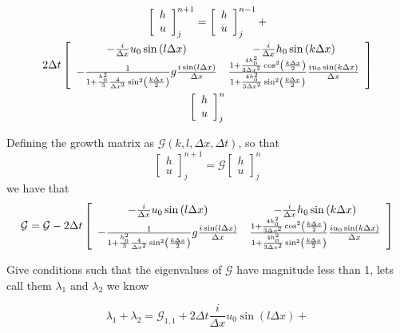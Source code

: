 \documentclass[12pt]{article}
\begin{document}
\begin{multline}
\left[\begin{array}{c}
h \\
u
\end{array} \right]^{n+1}_j = \left[\begin{array}{c}
h \\
u
\end{array} \right]^{n-1}_j  + \\2 \Delta t\left[\begin{array}{c c}
-\frac{i}{\Delta x}u_0 \sin\left(l \Delta x\right) & -\frac{i}{\Delta x}h_0\sin\left(k \Delta x\right) \\
-\frac{1}{1 +\frac{h_0^2}{3}\frac{4}{\Delta x^2}\sin^2\left(\frac{k\Delta x}{2}\right) }g\frac{i \sin\left(l \Delta x\right)}{\Delta x} & \frac{1 + \frac{4h_0^2}{3\Delta x^2} \cos^2\left(\frac{k\Delta x}{2}\right) }{1 +\frac{4h^2_0}{3\Delta x^2}\sin^2\left(\frac{k\Delta x}{2}\right) }  \frac{i u_0 \sin\left(k \Delta x\right)}{\Delta x}
\end{array} \right] \\  \left[\begin{array}{c}
h \\
u
\end{array} \right]^{n}_j 
\end{multline}


Defining the growth matrix as $\mathcal{G}(k,l,
\Delta x, \Delta t)$, so that \[
\left[\begin{array}{c}
h \\
u
\end{array} \right]^{n+1}_j = \mathcal{G}\left[\begin{array}{c}
h \\
u
\end{array} \right]^{n}_j\] 
we have
that 
\[\mathcal{G} = \mathcal{G} - 2 \Delta t\left[\begin{array}{c c}
-\frac{i}{\Delta x}u_0 \sin\left(l \Delta x\right) & -\frac{i}{\Delta x}h_0\sin\left(k \Delta x\right) \\
-\frac{1}{1 +\frac{h_0^2}{3}\frac{4}{\Delta x^2}\sin^2\left(\frac{k\Delta x}{2}\right) }g\frac{i \sin\left(l \Delta x\right)}{\Delta x} & \frac{1 + \frac{4h_0^2}{3\Delta x^2} \cos^2\left(\frac{k\Delta x}{2}\right) }{1 +\frac{4h^2_0}{3\Delta x^2}\sin^2\left(\frac{k\Delta x}{2}\right) }  \frac{i u_0 \sin\left(k \Delta x\right)}{\Delta x}
\end{array} \right] \]

Give conditions such that the eigenvalues of $\mathcal{G}$ have magnitude less than 1, lets call them $\lambda_1$ and $\lambda_2$ we know

$$\lambda_1 + \lambda_2 = \mathcal{G}_{1,1} + 2\Delta t\frac{i}{\Delta x}u_0 \sin\left(l \Delta x\right) + $$
\end{document}
